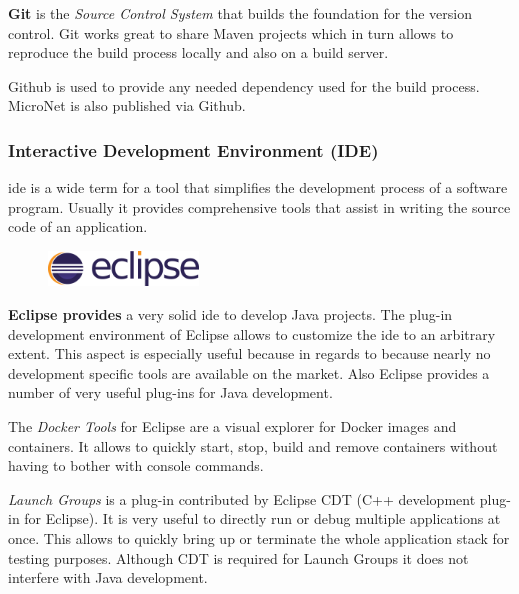 \textbf{Git} is the \textit{Source Control System} that builds the foundation
for the version control. Git works great to share Maven projects which in turn
allows to reproduce the build process locally and also on a build server.

Github is used to provide any needed dependency used for the build process.
MicroNet is also published via Github.

\subsubsection{Interactive Development Environment (IDE)}

\gls{ide} is a wide term for a tool that simplifies the development process of a
software program. Usually it provides comprehensive tools that assist in writing
the source code of an application.\\

\begin{figure}
    \includegraphics[width=4cm]{images/dependencies/eclipse}
\end{figure}

\textbf{Eclipse provides} a very solid \gls{ide} to develop Java projects. The
plug-in development environment of Eclipse allows to customize the \gls{ide} to
an arbitrary extent. This aspect is especially useful because in regards to
\mss{} because nearly no \ms{} development specific tools are available on the
market. Also Eclipse provides a number of very useful plug-ins for Java
development.

The \textit{Docker Tools} for Eclipse are a visual explorer  for Docker images
and containers. It allows to quickly start, stop, build and remove containers
without having to bother with console commands.

\textit{Launch Groups} is a plug-in contributed by Eclipse CDT (C++ development
plug-in for Eclipse). It is very useful to directly run or debug multiple
applications at once. This allows to quickly bring up or terminate the whole
application stack for testing purposes. Although CDT is required for Launch
Groups it does not interfere with Java development.
































